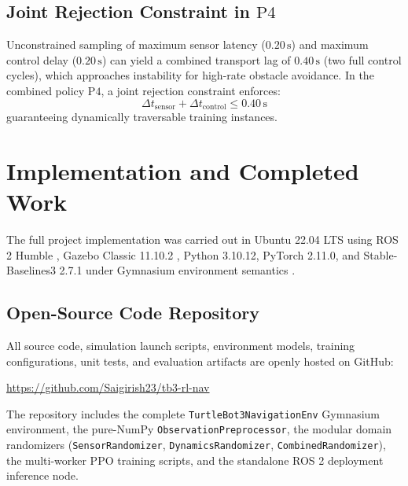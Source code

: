 \documentclass[conference]{IEEEtran}
\begin{document}
\subsection{Joint Rejection Constraint in $\text{P4}$}
Unconstrained sampling of maximum sensor latency ($0.20\,\text{s}$) and maximum control delay ($0.20\,\text{s}$) can yield a combined transport lag of $0.40\,\text{s}$ (two full control cycles), which approaches instability for high-rate obstacle avoidance. In the combined policy $\text{P4}$, a joint rejection constraint enforces:
\begin{equation}
\Delta t_{\text{sensor}} + \Delta t_{\text{control}} \le 0.40\,\text{s}
\end{equation}
guaranteeing dynamically traversable training instances.

\section{Implementation and Completed Work}
The full project implementation was carried out in Ubuntu 22.04 LTS using ROS 2 Humble \cite{macenski2022robot}, Gazebo Classic 11.10.2 \cite{koenig2004design}, Python 3.10.12, PyTorch 2.11.0, and Stable-Baselines3 2.7.1 \cite{raffin2021stable} under Gymnasium environment semantics \cite{towers2023gymnasium}.

\subsection{Open-Source Code Repository}
All source code, simulation launch scripts, environment models, training configurations, unit tests, and evaluation artifacts are openly hosted on GitHub:
\begin{center}
\url{https://github.com/Saigirish23/tb3-rl-nav}
\end{center}
The repository includes the complete \texttt{TurtleBot3NavigationEnv} Gymnasium environment, the pure-NumPy \texttt{ObservationPreprocessor}, the modular domain randomizers (\texttt{SensorRandomizer}, \texttt{DynamicsRandomizer}, \texttt{CombinedRandomizer}), the multi-worker PPO training scripts, and the standalone ROS 2 deployment inference node.
\end{document}
